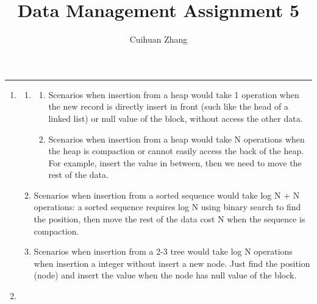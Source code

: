 \documentclass[12pt]{extarticle}
\title{Data Management Assignment 5}
\author{Cuihuan Zhang}
\begin{document}
\maketitle \vspace{-10mm}
\rule{\linewidth}{0.4pt}


\begin{flushleft}
\begin{enumerate}

\item

\begin{enumerate}

\item

\begin{enumerate}
\item Scenarios when insertion from a heap would take 1 operation when the new record is directly insert in front (such like the head of a linked list) or null value of the block, without access the other data.
\item Scenarios when insertion from a heap would take N operations when the heap is compaction or cannot easily access the back of the heap. For example, insert the value in between, then we need to move the rest of the data.
\end{enumerate}

\item Scenarios when insertion from a sorted sequence would take log N + N operations: a sorted sequence requires log N using binary search to find the position, then move the rest of the data cost N when the sequence is compaction.

\item Scenarios when insertion from a 2-3 tree would take log N operations when insertion a integer without insert a new node. Just find the position (node) and insert the value when the node has null value of the block.
\end{enumerate}

\item
\begin{enumerate}


\end{enumerate}
\end{enumerate}
\end{flushleft}
\end{document}
